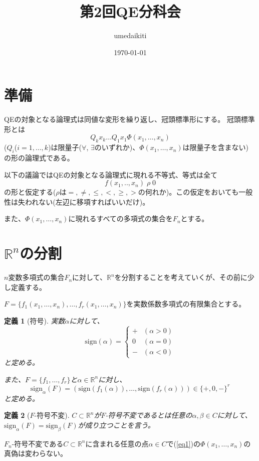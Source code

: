 \documentclass[a4j, 12pt]{jsarticle}
\title{第2回QE分科会}
\author{umedaikiti}
\date{\today}
\theoremstyle{break}
\newtheorem{Definition}{定義}[section]
\begin{document}
\maketitle

\section{準備}
QEの対象となる論理式は同値な変形を繰り返し、冠頭標準形にする。
冠頭標準形とは
\begin{equation}
\label{eq1}
Q_k x_k \dots Q_1 x_1 \Phi(x_1, \dots , x_n)
\end{equation}
($Q_i$($i = 1 , \dots , k$)は限量子($\forall$, $\exists$のいずれか)、$\Phi(x_1, \dots , x_n)$は限量子を含まない)
の形の論理式である。

以下の議論ではQEの対象となる論理式に現れる不等式、等式は全て
\[f(x_1, .., x_n) \; \rho \; 0\]
の形と仮定する($\rho$は$=, \ne, \le, <, \ge, >$の何れか)。この仮定をおいても一般性は失われない(左辺に移項すればいいだけ)。

また、$\Phi(x_1, \dots , x_n)$に現れるすべての多項式の集合を$F_n$とする。

\section{$\mathbb{R} ^ n$の分割}
$n$変数多項式の集合$F_n$に対して、$\mathbb{R}^n$を分割することを考えていくが、その前に少し定義する。

$F = \{ f_1(x_1, \dots , x_n), \dots , f_r (x_1, \dots , x_n) \}$を実数係数多項式の有限集合とする。
\begin{Definition}[符号]
実数$\alpha$に対して、
\[
\mathrm{sign}(\alpha) =
\begin{cases}
+ & (\alpha > 0) \\
0 & (\alpha = 0) \\
- & (\alpha < 0)
\end{cases}
\]
と定める。

また、$F = \{ f_1, \dots , f_r\}$と$\alpha \in \mathbb{R} ^ n$に対し、
\[\mathrm{sign}_{\alpha} (F) = (\mathrm{sign}(f_1(\alpha)), \dots , \mathrm{sign}(f_r(\alpha))) \in \{ +, 0, - \}^r \]
と定める。
\end{Definition}

\begin{Definition}[$F$-符号不変]
$C \subset \mathbb{R} ^ n$が$F$-符号不変であるとは任意の$\alpha , \beta \in C$に対して、$\mathrm{sign}_{\alpha} (F) = \mathrm{sign}_{\beta} (F)$が成り立つことを言う。
\end{Definition}
$F_n$-符号不変である$C \subset \mathbb{R} ^ n$に含まれる任意の点$\alpha \in C$で(\ref{eq1})の$\Phi(x_1, \dots , x_n)$の真偽は変わらない。
\end{document}
